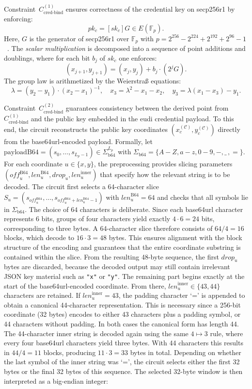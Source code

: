 \medskip
Constraint~$C_{\text{cred-bind}}^{(1)}$ ensures correctness of the credential key on secp256r1 by enforcing:
\[
pk_c = [sk_c]G \in E(\mathbb{F}_p).
\]
Here, $G$ is the generator of secp256r1 over $\mathbb{F}_{p}$ with $p = 2^{256}-2^{224}+2^{192}+2^{96}-1$
~\cite{SEC2}. The \emph{scalar multiplication} is decomposed into a sequence of point additions and doublings, where for each bit $b_j$ of $sk_c$ one enforces:
\[
(x_{j+1},y_{j+1})=(x_j,y_j)+b_j\cdot (2^j G).
\]
The group law is arithmetized by the Weierstraß equations:
\[
\lambda = (y_2-y_1)\cdot(x_2-x_1)^{-1}, \quad x_3=\lambda^2-x_1-x_2, \quad y_3=\lambda(x_1-x_3)-y_1.
\]

\medskip
Constraint~$C_{\text{cred-bind}}^{(2)}$ guarantees consistency between the derived point from $C_{\text{cred-bind}}^{(1)}$ and the public key embedded in the \acrshort{eudi} credential payload. To this end, the circuit reconstructs the public key coordinates $(x_c^{(\mathcal{C})},y_c^{(\mathcal{C})})$ directly from the base64url-encoded payload. Formally, let $\mathrm{payloadB64}=(s_0,\dots,s_{L_p-1}) \in \Sigma_{\mathrm{b64}}^{L_p}$ with $\Sigma_{\mathrm{b64}}=\{A\!-\!Z,a\!-\!z,0\!-\!9,-,\_\,,=\}$. For each coordinate $u \in \{x,y\}$, the preprocessing provides slicing parameters $(\mathit{off}_u^{\mathrm{B64}}, \mathit{len}_u^{\mathrm{B64}}, \mathit{drop}_u, \mathit{len}_u^{\mathrm{inner}})$ that specify how the relevant string is to be decoded. The circuit first selects a 64-character slice $S_u=(s_{\mathit{off}_u^{\mathrm{B64}}},\dots,s_{\mathit{off}_u^{\mathrm{B64}}+\mathit{len}_u^{\mathrm{B64}}-1})$ with $\mathit{len}_u^{\mathrm{B64}}=64$ and checks that all symbols lie in $\Sigma_{\mathrm{b64}}$. The choice of $64$ characters is deliberate. Since each base64url character represents 6 bits, groups of four characters yield exactly $4\cdot 6=24$ bits, corresponding to three bytes. A 64-character slice therefore consists of $64/4=16$ blocks, which decode to $16\cdot 3=48$ bytes. This ensures alignment with the block structure of the encoding and guarantees that the entire coordinate substring is contained within the slice. From the resulting 48-byte sequence, the first $\mathit{drop}_u$ bytes are discarded, because the decoded output may still contain irrelevant JSON key material such as \texttt{"x"} or \texttt{"y"}. The remaining part begins exactly at the start of the base64url-encoded coordinate. From there, $\mathit{len}_u^{\mathrm{inner}}\in\{43,44\}$ characters are retained. If $\mathit{len}_u^{\mathrm{inner}}=43$, the padding character `=' is appended to obtain a canonical 44-character representation. This is necessary since a 256-bit coordinate (32 bytes) encodes to either 43 characters plus a padding symbol, or 44 characters without padding. In both cases the canonical form has length 44. The 44-character inner string is decoded again using the same $4\mapsto 3$ rule, where every four base64url characters yield three bytes. With 44 characters this results in $44/4=11$ blocks, producing $11\cdot 3=33$ bytes in total. Depending on whether the last symbol of the inner string was `=', the circuit selects either the first 32 bytes or the final 32 bytes of this sequence. The selected 32-byte window is then interpreted as a big-endian integer:
